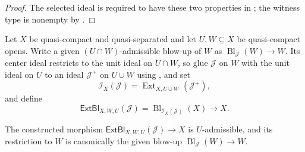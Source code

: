 \begin{proof}
  The selected ideal is required to have these two properties in
  ; the witness type is nonempty
  by .
\end{proof}

\begin{definition}
  \label{def:nagata-extended-admissible-blowup}

  Let $X$ be quasi-compact and quasi-separated and let $U,W\subseteq X$ be
  quasi-compact opens.  Write a given $(U\cap W)$-admissible blow-up of $W$
  as $\operatorname{Bl}_{\mathcal J}(W)\to W$.  Its center ideal restricts
  to the unit ideal on $U\cap W$, so glue $\mathcal J$ on $W$ with the unit
  ideal on $U$ to an ideal $\mathcal J^+$ on $U\cup W$ using
  , and set
  \[
    \mathcal I_{X}(\mathcal J)
      =\operatorname{Ext}_{X,U\cup W}(\mathcal J^+),
  \]
  and define
  \[
    \mathsf{ExtBl}_{X,W,U}(\mathcal J)
      =\operatorname{Bl}_{\mathcal I_X(\mathcal J)}(X)\longrightarrow X.
  \]
\end{definition}

\begin{lemma}
  \label{lemma:nagata-extend-admissible-blowup}

  The constructed morphism
  $\mathsf{ExtBl}_{X,W,U}(\mathcal J)\to X$ is $U$-admissible, and its
  restriction to $W$ is canonically the given blow-up
  $\operatorname{Bl}_{\mathcal J}(W)\to W$.
\end{lemma}

